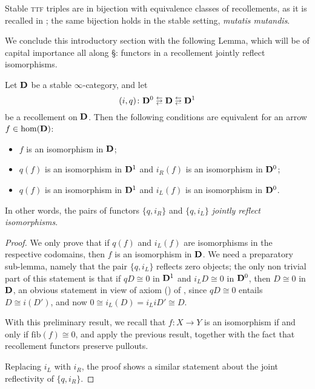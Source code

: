 Stable \textsc{ttf} triples are in bijection with equivalence classes of recollements, as it is recalled in \cite[ \textbf{4.2.4}]{ttftriples}; the same bijection holds in the stable setting, \emph{mutatis mutandis}.

We conclude this introductory section with the following Lemma, which will be of capital importance all along \S{}: functors in a recollement jointly reflect isomorphisms.
\begin{lemma}\label{reflectsall}
Let $\mathbf{D}$ be a stable $\infty$\hyp{}category, and let $$(i,q)\colon \D^0 \lrlarrows  \D  \lrlarrows  \D^1$$
be a recollement on $\mathbf{D}$. Then the following conditions are equivalent for an arrow $f\in \text{hom}(\mathbf{D})$:
\begin{itemize}
\item $f$ is an isomorphism in $\mathbf{D}$;
\item $q(f)$ is an isomorphism in $\mathbf{D}^1$ and $i_R(f)$ is an isomorphism in $\mathbf{D}^0$;
\item $q(f)$ is an isomorphism in $\mathbf{D}^1$ and $i_L(f)$ is an isomorphism in $\mathbf{D}^0$.
\end{itemize}
In other words, the pairs of functors $\{q, i_R\}$ and $\{q, i_L\}$ \emph{jointly reflect isomorphisms}.
\end{lemma}
\begin{proof}
We only prove that if $q(f)$ and $i_L(f)$ are isomorphisms in the respective codomains, then $f$ is an isomorphism in $\mathbf{D}$. We need a preparatory sub\hyp{}lemma, namely that the pair $\{q, i_L\}$ reflects zero objects; the only non trivial part of this statement is that if $qD\cong 0$ in $\mathbf{D}^1$ and $i_LD\cong 0$ in $\mathbf{D}^0$, then $D\cong 0$ in $\mathbf{D}$, an obvious statement in view of axiom () of  , since $qD\cong 0$ entails $D\cong i(D')$, and now $0\cong i_L(D)=i_LiD' \cong D$.

With this preliminary result, we recall that $f\colon X\to Y$ is an isomorphism if and only if $\text{fib}(f)\cong 0$, and apply the previous result, together with the fact that recollement functors preserve pullouts.

Replacing $i_L$ with $i_R$, the proof shows a similar statement about the joint reflectivity of $\{q, i_R\}$.
\end{proof}
